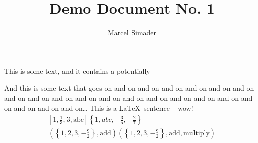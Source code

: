 \documentclass[a4paper, 12pt]{article}
\title{Demo Document No. 1\\[0.4em]\smaller{for the SEPTeX module}}
\author{Marcel Simader}
\date{}
\begin{document}
	\maketitle
	
	\noindent This is some text, and it contains a potentially %
	
	And this is some text that goes on and on and on and on and on and on and on and on and on and on 
		and on and on and on and on and on and on and on and on and on and on and on\ldots
	This is a \LaTeX\ sentence -- wow!
	\begin{gather*}
		\left[ 1, \frac{1}{3}, 3, \text{abc} \right]
		\left\{ 1, abc, -\frac{3}{5}, -\frac{2}{7} \right\}
		\\
		\left( \left\{ 1, 2, 3, -\frac{9}{2} \right\}, \text{add} \right)
		\left( \left\{ 1, 2, 3, -\frac{9}{2} \right\}, \text{add}, \text{multiply} \right)
	\end{gather*}
	
	\newpage
	
\end{document}
